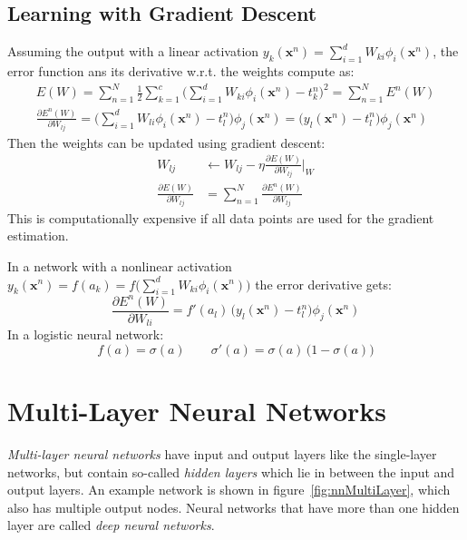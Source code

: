 \documentclass[a4paper, 11pt, accentcolor = tud3b]{tudreport}
\renewcommand{\vec}[1]{\mathbf{#1}}
\begin{document}
			\subsection{Learning with Gradient Descent}
				Assuming the output with a linear activation \( y_k(\vec{x}^n) = \sum_{i = 1}^{d} W_{ki} \phi_i(\vec{x}^n) \), the error function ans its derivative w.r.t. the weights compute as:
				\begin{gather}
					E(W) = \sum_{n = 1}^{N} \frac{1}{2} \sum_{k = 1}^{c} \Bigg( \sum_{i = 1}^{d} W_{ki} \phi_i(\vec{x}^n) - t_k^n \Bigg)^2 = \sum_{n = 1}^{N} E^n(W) \\
					\frac{\partial E^n(W)}{\partial W_{lj}} = \Bigg( \sum_{i = 1}^{d} W_{li} \phi_i(\vec{x}^n) - t_l^n \Bigg) \phi_j(\vec{x}^n) = \big( y_l(\vec{x}^n) - t_l^n \big) \phi_j(\vec{x}^n)
				\end{gather}
				Then the weights can be updated using gradient descent:
				\begin{align}
					W_{lj} &\gets W_{lj} - \eta \frac{\partial E(W)}{\partial W_{lj}} \Bigg\vert_W \\
					\frac{\partial E(W)}{\partial W_{lj}} &= \sum_{n = 1}^{N} \frac{\partial E^n(W)}{\partial W_{lj}}
				\end{align}
				This is computationally expensive if all data points are used for the gradient estimation.
				
				In a network with a nonlinear activation \( y_k(\vec{x}^n) = f(a_k) = f\Big( \sum_{i = 1}^{d} W_{ki} \phi_i(\vec{x}^n) \Big) \) the error derivative gets:
				\begin{equation}
					\frac{\partial E^n(W)}{\partial W_{li}} = f'(a_l) \, \big( y_l(\vec{x}^n) - t_l^n \big) \phi_j(\vec{x}^n)
				\end{equation}
				In a logistic neural network:
				\begin{equation}
					f(a) = \sigma(a) \qquad \sigma'(a) = \sigma(a) \, \big( 1 - \sigma(a) \big)
				\end{equation}

		\section{Multi-Layer Neural Networks}
			\emph{Multi-layer neural networks} have input and output layers like the single-layer networks, but contain so-called \emph{hidden layers} which lie in between the input and output layers. An example network is shown in figure~\ref{fig:nnMultiLayer}, which also has multiple output nodes. Neural networks that have more than one hidden layer are called \emph{deep neural networks}.
			
\end{document}

